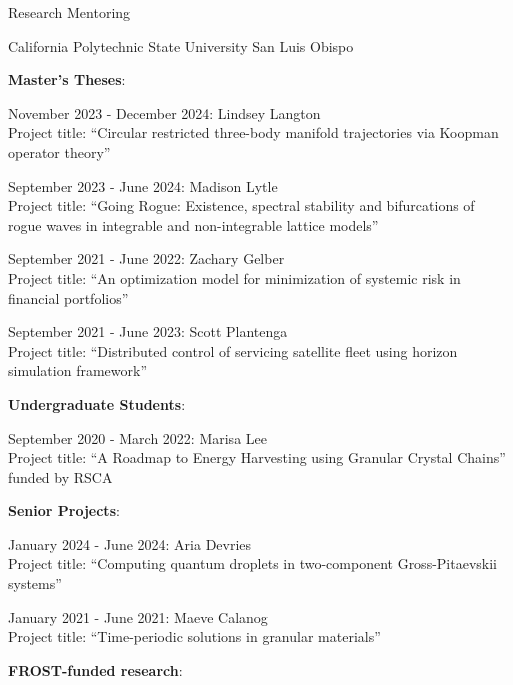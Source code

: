 \documentclass[10pt]{article} %
\newenvironment{outerlist}[1][\enskip\textbullet]%
        {\begin{itemize}[#1]}{\end{itemize}%
         \vspace{-.6\baselineskip}}
\newenvironment{innerlist}[1][\enskip\textbullet]%
        {\begin{compactitem}[#1]}{\end{compactitem}}
\begin{document}
\begin{section}{Research Mentoring}
\begin{outerlist}
\item[$\bullet$] California Polytechnic State University San Luis Obispo
\begin{innerlist}
\item[$\triangleright$] \textbf{Master's Theses}:
\begin{innerlist}
\item[$\star$] November 2023 - December 2024: Lindsey Langton\\
Project title: ``Circular restricted three-body manifold trajectories
via Koopman operator theory''
\item[$\star$] September 2023 - June 2024: Madison Lytle\\
Project title: ``Going Rogue: Existence, spectral stability and bifurcations of rogue waves in
integrable and non-integrable lattice models''
\item[$\star$] September 2021 - June 2022: Zachary Gelber\\
Project title: ``An optimization model for minimization of systemic risk in financial portfolios''
\item[$\star$] September 2021 - June 2023: Scott Plantenga\\
Project title: ``Distributed control of servicing satellite fleet using horizon simulation framework''
\end{innerlist}
\item[$\triangleright$] \textbf{Undergraduate Students}:
\begin{innerlist}
\item[$\star$] September 2020 - March 2022: Marisa Lee\\
Project title: ``A Roadmap to Energy Harvesting using Granular Crystal Chains'' funded by RSCA
\end{innerlist}
\item[$\triangleright$] \textbf{Senior Projects}:
\begin{innerlist}
\item[$\star$] January 2024 - June 2024: Aria Devries\\
Project title: ``Computing quantum droplets in two-component Gross-Pitaevskii systems''
\item[$\star$] January 2021 - June 2021: Maeve Calanog\\
Project title: ``Time-periodic solutions in granular materials''
\end{innerlist}
\item[$\triangleright$] \textbf{FROST-funded research}:
\begin{innerlist}

\end{innerlist}
\end{innerlist}
\end{outerlist}
\end{section}
\end{document}
